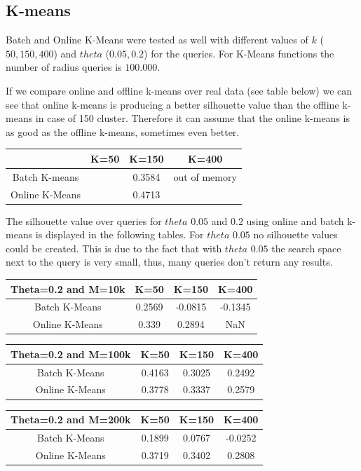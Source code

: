 \documentclass{lmproj}
\begin{document}
\subsection{K-means}
Batch and Online K-Means were tested as well with different values of $k$ ($50,150,400$) and $theta$ ($0.05,0.2$) for the queries. For K-Means functions the number of radius queries is $100.000$.

If we compare online and offline k-means over real data (see table below) we can see that online k-means is producing a better silhouette value than the offline k-means in case of 150 cluster. Therefore it can assume that the online k-means is as good as the offline k-means, sometimes even better.

\begin{tabular}{|c|c|c|c|}
	\hline  & K=50 & K=150 & K=400 \\ 
	\hline Batch K-means &  & 0.3584 & out of memory \\ 
	\hline Online K-Means &  & 0.4713 &  \\ 
	\hline 
\end{tabular} 

The silhouette value over queries for $theta$ $0.05$ and $0.2$ using online and batch k-means is displayed in the following tables. For $theta$ $0.05$ no silhouette values could be created. This is due to the fact that with $theta$ $0.05$ the search space next to the query is very small, thus, many queries don't return any results. 

\begin{tabular}{|c|c|c|c|}
	\hline Theta=0.2 and M=10k & K=50 & K=150 & K=400 \\ 
	\hline Batch K-Means & 0.2569 & -0.0815  & -0.1345  \\ 
	\hline Online K-Means & 0.339 & 0.2894 & NaN \\ 
	\hline 
\end{tabular}

\begin{tabular}{|c|c|c|c|}
	\hline Theta=0.2 and M=100k & K=50 & K=150 & K=400 \\ 
	\hline Batch K-Means & 0.4163 & 0.3025  & 0.2492  \\ 
	\hline Online K-Means & 0.3778 & 0.3337 & 0.2579 \\ 
	\hline 
\end{tabular} 

\begin{tabular}{|c|c|c|c|}
	\hline Theta=0.2 and M=200k & K=50 & K=150 & K=400 \\ 
	\hline Batch K-Means & 0.1899 & 0.0767  & -0.0252  \\ 
	\hline Online K-Means & 0.3719 & 0.3402 & 0.2808 \\ 
	\hline 
\end{tabular}
\end{document}
